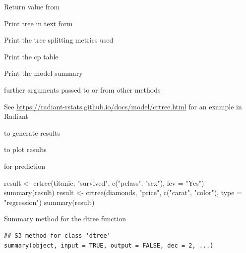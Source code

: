\documentclass[a4paper]{book}
\begin{document}
%
\begin{Arguments}
\begin{ldescription}
\item[\code{object}] Return value from 

\item[\code{prn}] Print tree in text form

\item[\code{splits}] Print the tree splitting metrics used

\item[\code{cptab}] Print the cp table

\item[\code{modsum}] Print the model summary

\item[\code{...}] further arguments passed to or from other methods
\end{ldescription}
\end{Arguments}
%
\begin{Details}
See \url{https://radiant-rstats.github.io/docs/model/crtree.html} for an example in Radiant
\end{Details}
%
\begin{SeeAlso}
 to generate results

 to plot results

 for prediction
\end{SeeAlso}
%
\begin{Examples}
\begin{ExampleCode}
result <- crtree(titanic, "survived", c("pclass", "sex"), lev = "Yes")
summary(result)
result <- crtree(diamonds, "price", c("carat", "color"), type = "regression")
summary(result)
\end{ExampleCode}
\end{Examples}
%
\begin{Description}
Summary method for the dtree function
\end{Description}
%
\begin{Usage}
\begin{verbatim}
## S3 method for class 'dtree'
summary(object, input = TRUE, output = FALSE, dec = 2, ...)
\end{verbatim}
\end{Usage}
%
\end{document}
